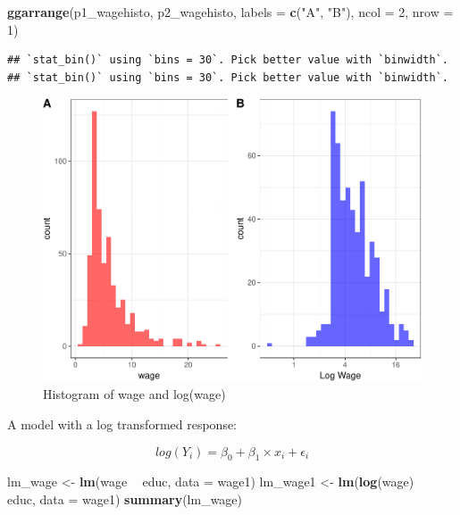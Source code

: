 \documentclass[]{book}
\newenvironment{Shaded}{\begin{snugshade}}{\end{snugshade}}
\newcommand{\DataTypeTok}[1]{\textcolor[rgb]{0.13,0.29,0.53}{#1}}
\newcommand{\DecValTok}[1]{\textcolor[rgb]{0.00,0.00,0.81}{#1}}
\newcommand{\KeywordTok}[1]{\textcolor[rgb]{0.13,0.29,0.53}{\textbf{#1}}}
\newcommand{\NormalTok}[1]{#1}
\newcommand{\OperatorTok}[1]{\textcolor[rgb]{0.81,0.36,0.00}{\textbf{#1}}}
\newcommand{\StringTok}[1]{\textcolor[rgb]{0.31,0.60,0.02}{#1}}
\begin{document}
\begin{Shaded}
\begin{Highlighting}[]
\KeywordTok{ggarrange}\NormalTok{(p1_wagehisto, p2_wagehisto,  }
          \DataTypeTok{labels =} \KeywordTok{c}\NormalTok{(}\StringTok{"A"}\NormalTok{, }\StringTok{"B"}\NormalTok{),}
          \DataTypeTok{ncol =} \DecValTok{2}\NormalTok{, }\DataTypeTok{nrow =} \DecValTok{1}\NormalTok{)}
\end{Highlighting}
\end{Shaded}

\begin{verbatim}
## `stat_bin()` using `bins = 30`. Pick better value with `binwidth`.
## `stat_bin()` using `bins = 30`. Pick better value with `binwidth`.
\end{verbatim}

\begin{figure}

{\centering \includegraphics[width=0.8\linewidth]{MEM5220_R_files/figure-latex/fig11-1} 

}

\caption{Histogram of wage and log(wage)}\label{fig:fig11}
\end{figure}

A model with a log transformed response:

\begin{equation}
log(Y_{i}) = \beta_{0} + \beta_{1} \times x_{i} + \epsilon_{i}
\end{equation}

\begin{Shaded}
\begin{Highlighting}[]
\NormalTok{lm_wage <-}\StringTok{ }\KeywordTok{lm}\NormalTok{(wage }\OperatorTok{~}\StringTok{ }\NormalTok{educ, }\DataTypeTok{data =}\NormalTok{ wage1)}
\NormalTok{lm_wage1 <-}\StringTok{ }\KeywordTok{lm}\NormalTok{(}\KeywordTok{log}\NormalTok{(wage) }\OperatorTok{~}\StringTok{ }\NormalTok{educ, }\DataTypeTok{data =}\NormalTok{  wage1)}
\KeywordTok{summary}\NormalTok{(lm_wage)}
\end{Highlighting}
\end{Shaded}
\end{document}
